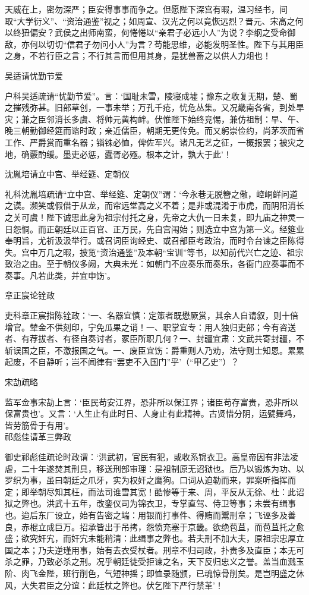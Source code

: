 \documentclass[]{article}
\begin{document}
天威在上，密勿深严；臣安得事事而争之。但愿陛下深宫有暇，温习经书，间取``大学衍义''、``资治通鉴''视之；如周宣、汉光之何以竟恢远烈？晋元、宋高之何以终狃偏安？武侯之出师南蛮，何惓惓以``亲君子必远小人''为说？李纲之受命御敌，亦何以切切``信君子勿问小人''为言？苟能思维，必能发明圣性。陛下与其用臣之身，不若行臣之言；不行其言而但用其身，是犹兽畜之以供人力俎也！

吴适请忧勤节爱

户科吴适疏请``忧勤节爱''。言：`国耻未雪，陵寝成墟；豫东之收复无期，楚、蜀之摧残弥甚。旧部草创，一事未举；万孔千疮，忧危丛集。又况畿南各省，到处旱灾；兼之臣邻消长多虞、将帅元黄构衅。伏惟陛下始终竞惕，兼仿祖制：早、午、晚三朝勤御经筵而谘时政；亲近儒臣，朝期无更传免。而又躬崇俭约，尚茅茨而省工作、严爵赏而重名器；锱铢必恤，俾佐军兴。诸凡无艺之征，一概报罢；被灾之地，确覈酌缓。墨吏必惩，蠹胥必殛。根本之计，孰大于此'！

沈胤培请立中宫、举经筵、定朝仪

礼科沈胤培疏请``立中宫、举经筵、定朝仪''谓：`今永巷无脱簪之儆，崆峒鲜问道之谟。濒笑或假借于从龙，而帘远堂高之义不着；是非或混淆于市虎，而阴阳消长之关可虞！陛下诚思此身为祖宗付托之身，先帝之大仇一日未复，即九庙之神灵一日怨恫。而正朝廷以正百官、正万民，先自宫闱始；则选立中宫为第一义。经筵业奉明旨，尤祈汲汲举行。或召词臣询经史、或召部臣考政治，而时令台谏之臣陈得失。宫中万几之暇，披览``资治通鉴''及本朝``宝训''等书，以知前代兴亡之迹、祖宗致治之由。至于朝仪多阙，大典未光：如朝门不应奏乐而奏乐，各衙门应奏事而不奏事。凡若此类，并宜申饬'。

章正宸论铨政

吏科章正宸指陈铨政：`一、名器宜慎：定策者既懋厥赏，其余人自请叙，则十倍增官。辇金不供刻印，宁免瓜果之诮！一、职掌宜专：用人独归吏部；今有咨送者、有荐拔者、有径自奏讨者，冢臣所职几何？一、封疆宜肃：文武共寄封疆，不斩误国之臣，不激报国之气。一、废臣宜饬：爵重则人乃劝，法守则士知恩。累累起废，不自静听；岂不闻律有``罢吏不入国门''乎'（``甲乙史''）？

宋劼疏略

监军佥事宋劼上言：`臣民苟安江界，恐非所以保江界；诸臣苟存富贵，恐非所以保富贵也'。又言：`人生止有此时日、人身止有此精神。古贤惜分阴，运甓舞鸡，皆劳筋骨于有用'。\\
祁彪佳请革三弊政

御史祁彪佳疏论时政谓：`洪武初，官民有犯，或收系锦衣卫。高皇帝因有非法凌虐，二十年遂焚其刑具，移送刑部审理：是祖制原无诏狱也。后乃以锻炼为功、以罗织为事，虽曰朝廷之爪牙，实为权奸之鹰狗。口词从迫勒而来，罪案听指挥而定；即举朝尽知其枉，而法司谁雪其宽！酷惨等于来、周，平反从无徐、杜：此诏狱之弊也。洪武十五年，改銮仪司为锦衣卫，专掌直驾、侍卫等事；未尝有缉事也。迨后东厂设立，始有告密之端：用银而打事件、得贿而鬻刑章；飞诬多及善良，赤棍立成巨万。招承皆出于吊拷，怨愤充塞于京畿。欲绝苞苴，而苞苴托之愈盛；欲究奸宄，而奸宄未能稍清：此缉事之弊也。若夫刑不加大夫，原祖宗忠厚立国之本；乃夫逆瑾用事，始有去衣受杖者。刑章不归司政，扑责多及直臣；本无可杀之罪，乃致必杀之刑。况乎朝廷徒受拒谏之名，天下反归忠义之誉。盖当血溅玉阶、肉飞金陛，班行削色，气短神摇；即恤录随颁，已魂惊骨削矣。是岂明盛之休风，大失君臣之分谊：此廷杖之弊也。伏乞陛下严行禁革'！
\end{document}
